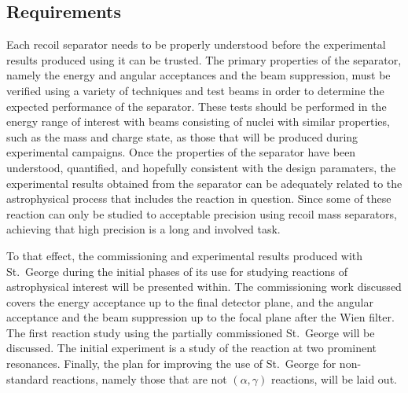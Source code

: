 \subsection{Requirements}

Each recoil separator needs to be properly understood before the
experimental results produced using it can be trusted. The primary
properties of the separator, namely the energy and angular acceptances
and the beam suppression, must be verified using a variety of techniques
and test beams in order to determine the expected performance of the
separator. These tests should be performed in the energy range of
interest with beams consisting of nuclei with similar properties, such
as the mass and charge state, as those that will be produced during
experimental campaigns. Once the properties of the separator have been
understood, quantified, and hopefully consistent with the design
paramaters, the experimental results obtained from the separator can be
adequately related to the astrophysical process that includes the
reaction in question. Since some of these reaction can only be studied
to acceptable precision using recoil mass separators, achieving that
high precision is a long and involved task.

To that effect, the commissioning and experimental results produced with
St.\ George during the initial phases of its use for studying reactions
of astrophysical interest will be presented within. The commissioning
work discussed covers the energy acceptance up to the final detector
plane, and the angular acceptance and the beam suppression up to the
focal plane after the Wien filter. The first reaction study using the
partially commissioned St.\ George will be discussed. The initial
experiment is a study of the \alpa{} reaction at two prominent
resonances. Finally, the plan for improving the use of St.\ George for
non-standard reactions, namely those that are not $(\alpha,\gamma)$
reactions, will be laid out.
